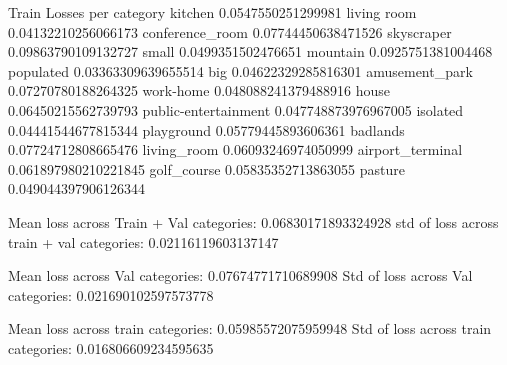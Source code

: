 \documentclass{UoYCSproject}
\begin{document}
Train Losses per category
kitchen 0.0547550251299981
living room 0.04132210256066173
conference_room 0.07744450638471526
skyscraper 0.09863790109132727
small 0.0499351502476651
mountain 0.0925751381004468
populated 0.03363309639655514
big 0.04622329285816301
amusement_park 0.07270780188264325
work-home 0.048088241379488916
house 0.06450215562739793
public-entertainment 0.047748873976967005
isolated 0.04441544677815344
playground 0.05779445893606361
badlands 0.07724712808665476
living_room 0.06093246974050999
airport_terminal 0.061897980210221845
golf_course 0.05835352713863055
pasture 0.049044397906126344

Mean loss across Train + Val categories: 0.06830171893324928
std of loss across train + val categories: 0.02116119603137147

Mean loss across Val categories: 0.07674771710689908
Std of loss across Val categories: 0.021690102597573778

Mean loss across train categories: 0.05985572075959948
Std of loss across train categories: 0.016806609234595635
\end{document}
